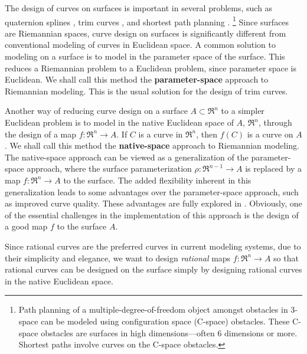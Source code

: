The design of curves on surfaces is important in several problems,
such as quaternion splines \cite{barr92,jj95},
trim curves \cite{hoschek89}, and
shortest path planning \cite{lozanoperez83,kim88}.
\ifFull
\footnote{Path planning 
	of a multiple-degree-of-freedom object amongst obstacles in 3-space
 	can be modeled using configuration space (C-space) obstacles.
 	These C-space obstacles are surfaces in high
 	dimensions---often 6 dimensions or more.
 	Shortest paths involve curves on the C-space obstacles.}
\fi
Since surfaces are Riemannian spaces, %
curve design on surfaces is significantly different from 
conventional modeling of curves in Euclidean space.
A common solution to modeling on a surface is to model in the parameter
space of the surface.
This reduces a Riemannian problem to a Euclidean problem,
since parameter space is Euclidean.
We shall call this method the {\bf parameter-space} approach to Riemannian
modeling.
This is the usual solution for the design of trim curves.

Another way of reducing curve design on a surface $A \subset \Re^n$
to a simpler Euclidean problem is to model in the native Euclidean space
of $A$, $\Re^n$, through the design of a map $f: \Re^n \rightarrow A$.
If $C$ is a curve in $\Re^{n}$, then $f(C)$ is a curve on $A$.
We shall call this method the {\bf native-space} approach to Riemannian 
modeling.
The native-space approach can be viewed as a generalization of the parameter-space
approach, where the surface parameterization $\rho:\Re^{n-1} \rightarrow A$
is replaced by a map $f: \Re^n \rightarrow A$ to the surface.
The added flexibility inherent in this generalization leads to 
some advantages over the parameter-space approach, 
such as improved curve quality.
These advantages are fully explored in \cite{jj+jimbo99}.
Obviously, one of the essential challenges in the implementation 
of this approach is the design of a good map $f$ to the surface $A$.

Since rational curves are the preferred curves in current modeling systems,
due to their simplicity and elegance,
we want to design {\em rational} maps $f: \Re^n \rightarrow A$ 
so that rational curves can be designed on the surface simply
by designing rational curves in the native Euclidean space.

